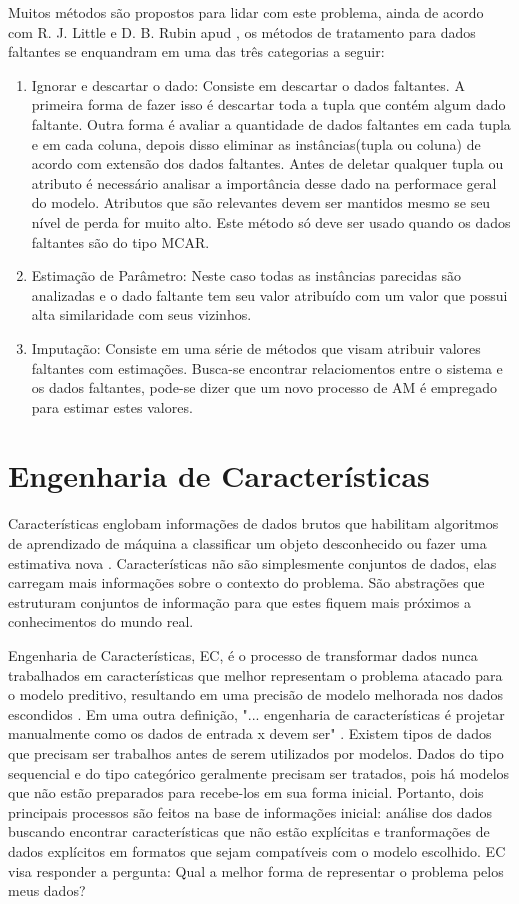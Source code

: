 Muitos métodos são propostos para lidar com este problema, ainda de acordo com  R. J. Little e D. B. Rubin apud , os métodos de tratamento para dados faltantes se enquandram em uma das três categorias a seguir:

\begin{enumerate}
\item Ignorar e descartar o dado: Consiste em descartar o dados faltantes. A primeira forma de fazer isso é descartar toda a tupla que contém algum dado faltante. Outra forma é avaliar a quantidade de dados faltantes em cada tupla e em cada coluna, depois disso eliminar as instâncias(tupla ou coluna) de acordo com extensão dos dados faltantes. Antes de deletar qualquer tupla ou atributo é necessário analisar a importância desse dado na performace geral do modelo. Atributos que são relevantes devem ser mantidos mesmo se seu nível de perda for muito alto. Este método só deve ser usado quando os dados faltantes são do tipo MCAR.
\item Estimação de Parâmetro: Neste caso todas as instâncias parecidas são analizadas e o dado faltante tem seu valor atribuído com um valor que possui alta similaridade com seus vizinhos.
\item Imputação: Consiste em uma série de métodos que visam atribuir valores faltantes com estimações. Busca-se encontrar relaciomentos entre o sistema e os dados faltantes, pode-se dizer que um novo processo de AM é empregado para estimar estes valores.
\end{enumerate}


\section{Engenharia de Características}

Características englobam informações de dados brutos que habilitam algoritmos de aprendizado de máquina a classificar um objeto desconhecido ou fazer uma estimativa nova \cite{brain2013}. Características não são simplesmente conjuntos de dados, elas carregam mais informações sobre o contexto do problema. São abstrações que estruturam conjuntos de informação para que estes fiquem mais próximos a conhecimentos do mundo real.   

Engenharia de Características, EC, é o processo de transformar dados nunca trabalhados em características que melhor representam o problema atacado para o modelo preditivo, resultando em uma precisão de modelo melhorada nos dados escondidos \cite{fe2014}. Em uma outra definição, "... engenharia de características é projetar manualmente como os dados de entrada x devem ser" \cite{tomas2014}. Existem tipos de dados que precisam ser trabalhos antes de serem utilizados por modelos. Dados do tipo sequencial e do tipo categórico geralmente precisam ser tratados, pois há modelos que não estão preparados para recebe-los em sua forma inicial. Portanto, dois principais processos são feitos na base de informações inicial: análise dos dados buscando encontrar características que não estão explícitas e tranformações de dados explícitos em formatos que sejam compatíveis com o modelo escolhido. EC visa responder a pergunta: Qual a melhor forma de representar o problema pelos meus dados?

